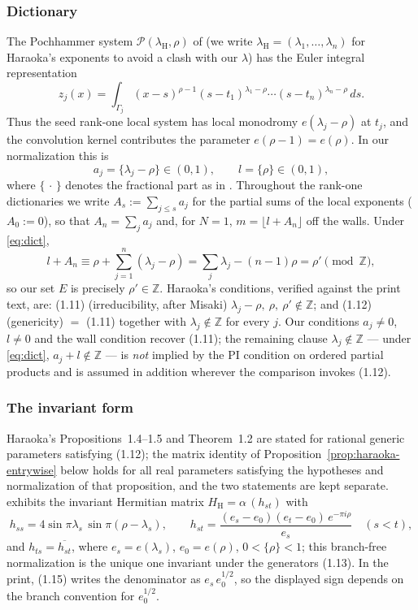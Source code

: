 \documentclass[11pt]{article}
\theoremstyle{definition}
\newcommand{\Z}{\mathbb Z}
\newcommand{\frc}[1]{\{#1\}}
\begin{document}
\subsubsection*{Dictionary}
The Pochhammer system $\mathcal P(\lambda_{\mathrm H},\rho)$ of \cite[\S1.0]{Haraoka1994}
(we write $\lambda_{\mathrm H}=(\lambda_1,\dots,\lambda_n)$ for Haraoka's
exponents to avoid a clash with our $\lambda$) has the Euler integral
representation \cite[(1.9)]{Haraoka1994}
\[
z_j(x)=\int_{\Gamma_j}(x-s)^{\rho-1}(s-t_1)^{\lambda_1-\rho}\cdots
(s-t_n)^{\lambda_n-\rho}\,ds .
\]
Thus the seed rank-one local system has local monodromy
$e(\lambda_j-\rho)$ at $t_j$, and the convolution kernel contributes the
parameter $e(\rho-1)=e(\rho)$. In our normalization this is
\begin{equation}\label{eq:dict}
a_j=\frc{\lambda_j-\rho}\in(0,1),
\qquad
l=\frc{\rho}\in(0,1),
\end{equation}
where $\frc{\,\cdot\,}$ denotes the fractional part as in \cite{Haraoka1994}.
Throughout the rank-one dictionaries we write $A_s:=\sum_{j\le s}a_j$
for the partial sums of the local exponents ($A_0:=0$), so that
$A_n=\sum_j a_j$ and, for $N=1$, $m=\lfloor l+A_n\rfloor$ off the
walls. Under \eqref{eq:dict},
\[
l+A_n\equiv \rho+\sum_{j=1}^n(\lambda_j-\rho)
=\sum_j\lambda_j-(n-1)\rho=\rho' \pmod\Z ,
\]
so our set $E$ is precisely $\rho'\in\Z$. Haraoka's conditions,
verified against the print text, are: (1.11) (irreducibility, after
Misaki) $\lambda_j-\rho,\ \rho,\ \rho'\notin\Z$; and (1.12)
(genericity) $=$ (1.11) together with $\lambda_j\notin\Z$ for every
$j$. Our conditions $a_j\neq0$, $l\neq0$ and the wall condition
recover (1.11); the remaining clause $\lambda_j\notin\Z$ --- under
\eqref{eq:dict}, $a_j+l\notin\Z$ --- is \emph{not} implied by the
PI condition on ordered partial products and is assumed in addition
wherever the comparison invokes (1.12).

\subsubsection*{The invariant form}
Haraoka's Propositions~1.4--1.5 and Theorem~1.2 are stated for
rational generic parameters satisfying (1.12); the matrix identity
of Proposition~\ref{prop:haraoka-entrywise} below holds for all real
parameters satisfying the hypotheses and normalization of that
proposition, and the two statements are kept separate.
\cite[Proposition~1.4]{Haraoka1994} exhibits the invariant Hermitian matrix
$H_{\mathrm H}=\alpha\,(h_{st})$ with
\[
h_{ss}=4\sin\pi\lambda_s\,\sin\pi(\rho-\lambda_s),\qquad
h_{st}=\frac{(e_s-e_0)(e_t-e_0)\,e^{-\pi i\rho}}{e_s}\quad(s<t),
\]
and $h_{ts}=\overline{h_{st}}$, where $e_s=e(\lambda_s)$,
$e_0=e(\rho)$, $0<\frc\rho<1$; this branch-free normalization is
the unique one invariant under the generators (1.13). In the print,
(1.15) writes the denominator as $e_s\,e_0^{1/2}$, so the displayed
sign depends on the branch convention for $e_0^{1/2}$.
\end{document}
